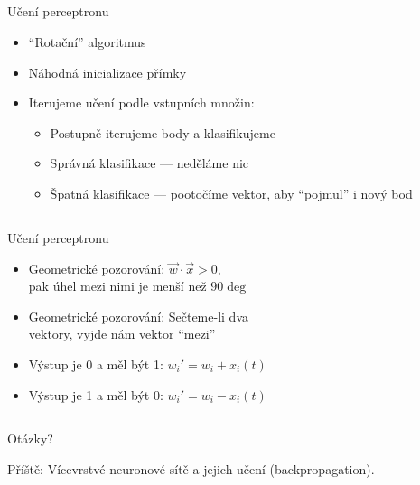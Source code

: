 \documentclass{beamer}
\begin{document}
\subsection{}
\begin{frame}{Učení perceptronu}
\begin{itemize}
\item ``Rotační'' algoritmus
\item Náhodná inicializace přímky
\item Iterujeme učení podle vstupních množin:
\begin{itemize}
\item Postupně iterujeme body a klasifikujeme
\item Správná klasifikace --- neděláme nic
\item Špatná klasifikace --- pootočíme vektor, aby ``pojmul'' i nový bod
\end{itemize}
\end{itemize}
\end{frame}

\subsection{}
\begin{frame}{Učení perceptronu}
\begin{itemize}
\item Geometrické pozorování: $\vec w \cdot \vec x > 0$, \\ pak úhel mezi nimi je menší než $90 \deg$
\item Geometrické pozorování: Sečteme-li dva \\ vektory, vyjde nám vektor ``mezi''
\item Výstup je 0 a měl být 1: $w_i' = w_i + x_i(t)$
\item Výstup je 1 a měl být 0: $w_i' = w_i - x_i(t)$
\end{itemize}
\end{frame}

\subsection{}
\begin{frame}{Otázky?}
\begin{center}
Příště: Vícevrstvé neuronové sítě a jejich učení (backpropagation).
\end{center}
\end{frame}
\end{document}
